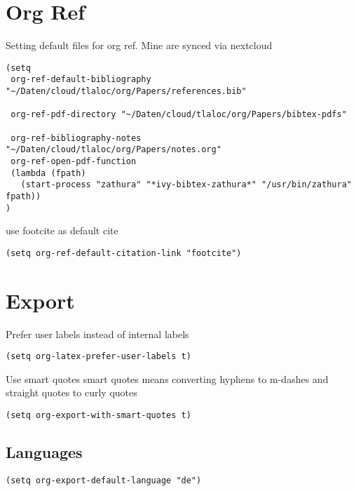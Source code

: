 \documentclass[11pt]{article}
\begin{document}
\section{Org Ref}
\label{sec:orgcfb2bde}
Setting default files for org ref.
Mine are synced via nextcloud
\begin{verbatim}
(setq
 org-ref-default-bibliography "~/Daten/cloud/tlaloc/org/Papers/references.bib"

 org-ref-pdf-directory "~/Daten/cloud/tlaloc/org/Papers/bibtex-pdfs"

 org-ref-bibliography-notes "~/Daten/cloud/tlaloc/org/Papers/notes.org"
 org-ref-open-pdf-function
 (lambda (fpath)
   (start-process "zathura" "*ivy-bibtex-zathura*" "/usr/bin/zathura" fpath))
)
\end{verbatim}
use footcite as default cite
\begin{verbatim}
(setq org-ref-default-citation-link "footcite")
\end{verbatim}
\section{Export}
\label{sec:org8cdfce3}
Prefer user labels instead of internal labels
\begin{verbatim}
(setq org-latex-prefer-user-labels t)
\end{verbatim}
Use smart quotes
smart quotes means converting hyphens to m-dashes and
straight quotes to curly quotes
\begin{verbatim}
(setq org-export-with-smart-quotes t)
\end{verbatim}
\subsection{Languages}
\label{sec:org1a80c01}
\begin{verbatim}
(setq org-export-default-language "de")
\end{verbatim}
\end{document}
